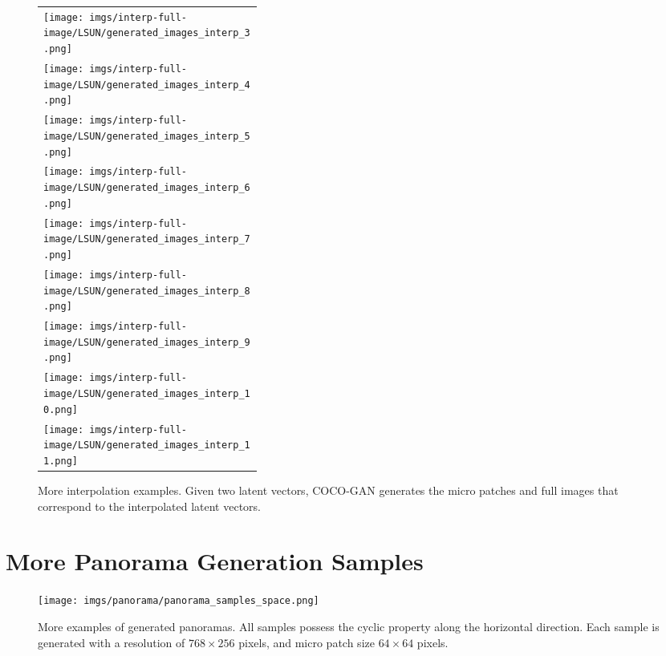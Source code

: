 \documentclass{article}
\newcommand{\modelName}{COCO-GAN }
\begin{document}
\begin{appendices}
\begin{figure}[H]
{\begin{tabular}{C{0.35\linewidth}}
            \texttt{[image: imgs/interp-full-image/LSUN/generated\_images\_interp\_3.png]} \\
            \texttt{[image: imgs/interp-full-image/LSUN/generated\_images\_interp\_4.png]} \\
            \texttt{[image: imgs/interp-full-image/LSUN/generated\_images\_interp\_5.png]} \\
            \texttt{[image: imgs/interp-full-image/LSUN/generated\_images\_interp\_6.png]} \\
            \texttt{[image: imgs/interp-full-image/LSUN/generated\_images\_interp\_7.png]} \\
            \texttt{[image: imgs/interp-full-image/LSUN/generated\_images\_interp\_8.png]} \\
            \texttt{[image: imgs/interp-full-image/LSUN/generated\_images\_interp\_9.png]} \\
            \texttt{[image: imgs/interp-full-image/LSUN/generated\_images\_interp\_10.png]} \\
            \texttt{[image: imgs/interp-full-image/LSUN/generated\_images\_interp\_11.png]} \\
        \end{tabular}}
        
        \caption{More interpolation examples. Given two latent vectors, \modelName generates the micro patches and full images that correspond to the interpolated latent vectors.}
    \end{figure}
    


\section{More Panorama Generation Samples}
    \label{appendix:panorama-samples}
    \begin{figure}[H]
        \texttt{[image: imgs/panorama/panorama\_samples\_space.png]}
        \caption{More examples of generated panoramas. All samples possess the cyclic property along the horizontal direction. Each sample is generated with a resolution of $768\times 256$ pixels, and micro patch size $64\times 64$ pixels.}
    \end{figure}
    
    \vspace{1em}
    

\end{appendices}
\end{document}
